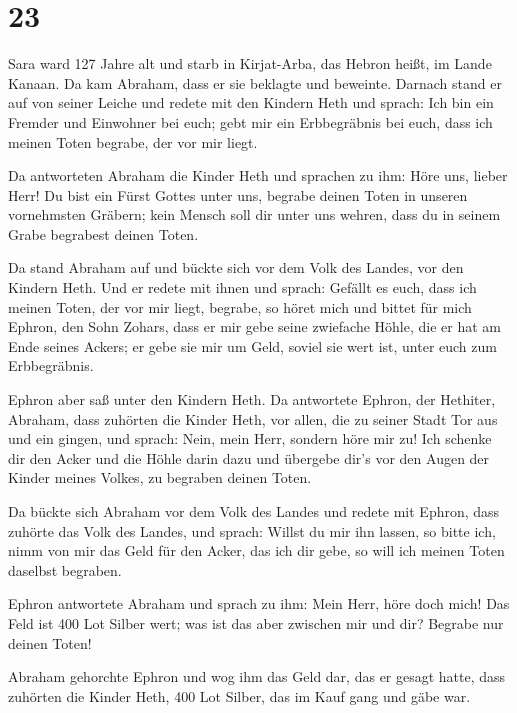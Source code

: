 \hypertarget{section-22}{%
\section{23}\label{section-22}}

 Sara ward 127 Jahre alt  und starb in
Kirjat-Arba, das Hebron heißt, im Lande Kanaan. Da kam Abraham, dass er
sie beklagte und beweinte.  Darnach stand er auf von
seiner Leiche und redete mit den Kindern Heth und sprach: 
Ich bin ein Fremder und Einwohner bei euch; gebt mir ein Erbbegräbnis
bei euch, dass ich meinen Toten begrabe, der vor mir liegt.

 Da antworteten Abraham die Kinder Heth und sprachen zu
ihm:  Höre uns, lieber Herr! Du bist ein Fürst Gottes
unter uns, begrabe deinen Toten in unseren vornehmsten Gräbern; kein
Mensch soll dir unter uns wehren, dass du in seinem Grabe begrabest
deinen Toten.

 Da stand Abraham auf und bückte sich vor dem Volk des
Landes, vor den Kindern Heth.  Und er redete mit ihnen und
sprach: Gefällt es euch, dass ich meinen Toten, der vor mir liegt,
begrabe, so höret mich und bittet für mich Ephron, den Sohn Zohars,
 dass er mir gebe seine zwiefache Höhle, die er hat am
Ende seines Ackers; er gebe sie mir um Geld, soviel sie wert ist, unter
euch zum Erbbegräbnis.

 Ephron aber saß unter den Kindern Heth. Da antwortete
Ephron, der Hethiter, Abraham, dass zuhörten die Kinder Heth, vor allen,
die zu seiner Stadt Tor aus und ein gingen, und sprach: 
Nein, mein Herr, sondern höre mir zu! Ich schenke dir den Acker und die
Höhle darin dazu und übergebe dir's vor den Augen der Kinder meines
Volkes, zu begraben deinen Toten.

 Da bückte sich Abraham vor dem Volk des Landes
 und redete mit Ephron, dass zuhörte das Volk des Landes,
und sprach: Willst du mir ihn lassen, so bitte ich, nimm von mir das
Geld für den Acker, das ich dir gebe, so will ich meinen Toten daselbst
begraben.

 Ephron antwortete Abraham und sprach zu ihm:
 Mein Herr, höre doch mich! Das Feld ist 400 Lot Silber
wert; was ist das aber zwischen mir und dir? Begrabe nur deinen Toten!

 Abraham gehorchte Ephron und wog ihm das Geld dar, das
er gesagt hatte, dass zuhörten die Kinder Heth, 400 Lot Silber, das im
Kauf gang und gäbe war.

